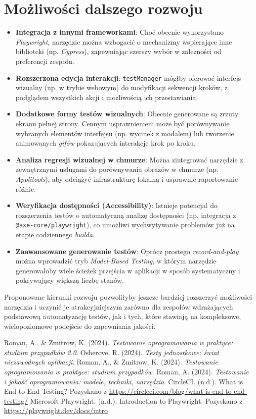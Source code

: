 \documentclass[12pt]{report}
\begin{document}
\section{Możliwości dalszego rozwoju}
\begin{itemize}
    \item \textbf{Integracja z innymi frameworkami}: Choć obecnie wykorzystano \emph{Playwright}, narzędzie można wzbogacić o mechanizmy wspierające inne biblioteki (np. \emph{Cypress}), zapewniając szerszy wybór w zależności od preferencji zespołu.
    \item \textbf{Rozszerzona edycja interakcji}: \texttt{testManager} mógłby oferować interfejs wizualny (np. w trybie webowym) do modyfikacji sekwencji kroków, z podglądem wszystkich akcji i możliwością ich przestawiania.
    \item \textbf{Dodatkowe formy testów wizualnych}: Obecnie generowane są zrzuty ekranu pełnej strony. Cennym usprawnieniem może być porównywanie wybranych elementów interfejsu (np. wycinek z modalem) lub tworzenie animowanych \emph{gifów} pokazujących interakcje krok po kroku.
    \item \textbf{Analiza regresji wizualnej w chmurze}: Można zintegrować narzędzie z zewnętrznymi usługami do porównywania obrazów w chmurze (np. \emph{Applitools}), aby odciążyć infrastrukturę lokalną i usprawnić raportowanie różnic.
    \item \textbf{Weryfikacja dostępności (Accessibility)}: Istnieje potencjał do rozszerzenia testów o automatyczną analizę dostępności (np. integracja z \texttt{@axe-core/playwright}), co umożliwi wychwytywanie problemów już na etapie codziennego \emph{builda}.
    \item \textbf{Zaawansowane generowanie testów}: Oprócz prostego \emph{record-and-play} można wprowadzić tryb \emph{Model-Based Testing}, w którym narzędzie generowałoby wiele ścieżek przejścia w aplikacji w sposób systematyczny i pokrywający większą liczbę stanów.
\end{itemize}

Proponowane kierunki rozwoju pozwoliłyby jeszcze bardziej rozszerzyć możliwości narzędzia i uczynić je atrakcyjniejszym zarówno dla zespołów wdrażających podstawową automatyzację testów, jak i tych, które stawiają na kompleksowe, wielopoziomowe podejście do zapewniania jakości.

\begin{thebibliography}{9}
     Roman, A., \& Zmitrow, K. (2024). \textit{Testowanie oprogramowania w praktyce: studium przypadków 2.0}.
     Osherove, R. (2024). \textit{Testy jednostkowe: świat niezawodnych aplikacji}.
     Roman, A., \& Zmitrow, K. (2024). \textit{Testowanie oprogramowania w praktyce: studium przypadków}.
     Roman, A. (2024). \textit{Testowanie i jakość oprogramowania: modele, techniki, narzędzia}.
     CircleCI. (n.d.). What is End-to-End Testing? Pozyskano z \url{https://circleci.com/blog/what-is-end-to-end-testing/}
     Microsoft Playwright. (n.d.). Introduction to Playwright. Pozyskano z \url{https://playwright.dev/docs/intro}
\end{thebibliography}
\end{document}
